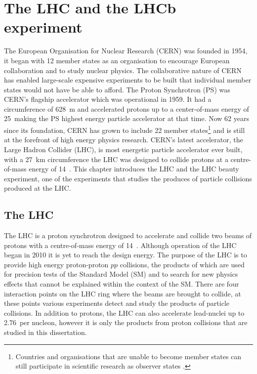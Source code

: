\chapter{The LHC and the LHCb experiment} 
\label{CERN_LHC_LHCb}

The European Organisation for Nuclear Research (CERN) was founded in 1954, it began with 12 member states as an organisation to encourage European collaboration and to study nuclear physics. The collaborative nature of CERN has enabled large-scale expensive experiments to be built that individual member states would not have be able to afford. The Proton Synchrotron (PS) was CERN's flagship accelerator which was operational in 1959. It had a circumference of 628~m and accelerated protons up to a center-of-mass energy of 25~\gev making the PS highest energy particle accelerator at that time. Now 62 years since its foundation, CERN has grown to include 22 member states\footnote{Countries and organisations that are unable to become member states can still participate in scientific research as observer states \cite{Member_States}.} and is still at the forefront of high energy physics research. CERN’s latest accelerator, the Large Hadron Collider (LHC), is most energetic particle accelerator ever built, with a 27~km circumference the LHC was designed to collide protons at a centre-of-mass energy of 14~\tev. This chapter introduces the LHC and the LHC beauty experiment, one of the experiments that studies the produces of particle collisions produced at the LHC.

\section{The LHC}
\label{LHC}


The LHC is a proton synchrotron designed to accelerate and collide two beams of protons with a centre-of-mass energy of 14~\tev. Although operation of the LHC began in 2010 it is yet to reach the design energy. The purpose of the LHC is to provide high energy proton-proton $pp$ collisions, the products of which are used for precision tests of the Standard Model (SM) and to search for new physics effects that cannot be explained within the context of the SM. %
There are four interaction points on the LHC ring where the beams are brought to collide, at these points various experiments detect and study the products of particle collisions. In addition to protons, the LHC can also accelerate lead-nuclei up to 2.76~\tev per nucleon, however it is only the products from proton collisions that are studied in this dissertation.

